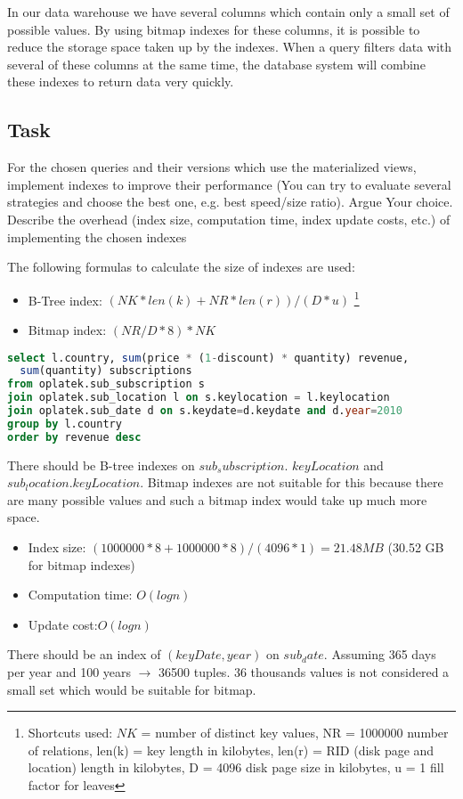 In our data warehouse we have several columns which contain only a small set of possible values. By using bitmap indexes for these columns, it is possible to reduce the storage space taken up by the indexes. When a query filters data with several of these columns at the same time, the database system will combine these indexes to return data very quickly.


\subsection*{Task} 
For the chosen queries and their versions which use the materialized views,
implement indexes to improve their performance (You can try to evaluate
several strategies and choose the best one, e.g. best speed/size ratio).
Argue Your choice. Describe the overhead (index size, computation time,
index update costs, etc.) of implementing the chosen indexes

The following formulas to calculate the size of indexes are used: 
\begin{itemize}
    \item B-Tree index: $(NK*len(k)+NR*len(r))/(D*u)$ \footnote{
Shortcuts used: $NK$ = number of distinct key values, NR = 1000000 number of relations, len(k) = key length in kilobytes, len(r) = RID (disk page and location) length in kilobytes, D = 4096 disk page size in kilobytes, u = 1 fill factor for leaves}
    \item Bitmap index: $(NR/D*8)*NK$
\end{itemize}

\begin{lstlisting}[language=sql]
select l.country, sum(price * (1-discount) * quantity) revenue, 
  sum(quantity) subscriptions 
from oplatek.sub_subscription s 
join oplatek.sub_location l on s.keylocation = l.keylocation 
join oplatek.sub_date d on s.keydate=d.keydate and d.year=2010
group by l.country 
order by revenue desc
\end{lstlisting}

There should be B-tree indexes on $sub_subscription$. $ keyLocation$ and $sub_location.keyLocation$. Bitmap indexes are not suitable for this because there are many possible values and such a bitmap index would take up much more space.
\begin{itemize}
\item Index size: $(1000000*8+1000000*8)/(4096*1) = 21.48 MB$ (30.52 GB for bitmap indexes)
\item Computation time: $O(log n)$
\item Update cost:$O(log n)$
\end{itemize}

There should be an index of $(keyDate, year)$ on $sub_date$. Assuming 365 days per year and 100 years $\rightarrow$ 36500 tuples. 36 thousands values is not considered a small set which would be suitable for bitmap. 
